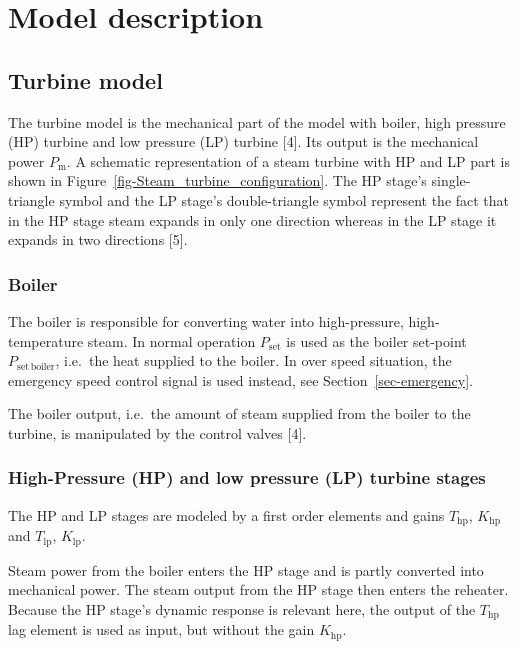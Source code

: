 \documentclass[
  a4paper,
  DIV=11,
  numbers=noendperiod]{scrartcl}
\begin{document}
\section{Model description}\label{model-description}

\subsection{Turbine model}\label{turbine-model}

The turbine model is the mechanical part of the model with boiler, high
pressure (HP) turbine and low pressure (LP) turbine {[}4{]}. Its output
is the mechanical power \(P_\mathrm{m}\). A schematic representation of
a steam turbine with HP and LP part is shown in
Figure~\ref{fig-Steam_turbine_configuration}. The HP stage's
single-triangle symbol and the LP stage's double-triangle symbol
represent the fact that in the HP stage steam expands in only one
direction whereas in the LP stage it expands in two directions {[}5{]}.

\subsubsection{Boiler}\label{boiler}

The boiler is responsible for converting water into high-pressure,
high-temperature steam. In normal operation \(P_\mathrm{set}\) is used
as the boiler set-point \(P_\mathrm{set\,boiler}\), i.e.~the heat
supplied to the boiler. In over speed situation, the emergency speed
control signal is used instead, see Section~\ref{sec-emergency}.

The boiler output, i.e.~the amount of steam supplied from the boiler to
the turbine, is manipulated by the control valves {[}4{]}.

\subsubsection{High-Pressure (HP) and low pressure (LP) turbine
stages}\label{high-pressure-hp-and-low-pressure-lp-turbine-stages}

The HP and LP stages are modeled by a first order elements and gains
\(T_\mathrm{hp}\), \(K_\mathrm{hp}\) and \(T_\mathrm{lp}\),
\(K_\mathrm{lp}\).

Steam power from the boiler enters the HP stage and is partly converted
into mechanical power. The steam output from the HP stage then enters
the reheater. Because the HP stage's dynamic response is relevant here,
the output of the \(T_\mathrm{hp}\) lag element is used as input, but
without the gain \(K_\mathrm{hp}\).
\end{document}
